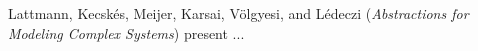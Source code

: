 

%

Lattmann, Kecsk\'{e}s, Meijer,
Karsai, V\"{o}lgyesi, and L\'{e}deczi
\cite{isola-2016-lattmann}
({\em Abstractions for Modeling Complex Systems})
present ...

